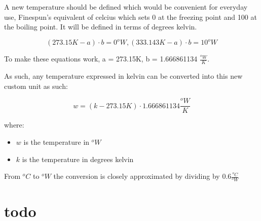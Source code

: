 \documentclass[a4paper]{article}
\begin{document}
	A new temperature should be defined which would be convenient for everyday use, Finespun's equivalent of celcius which sets 0 at the freezing point and 100 at the boiling point.
	It will be defined in terms of degrees kelvin.
	
	$$ (273.15K - a) \cdot b = 0^oW , (333.143K - a) \cdot b = 10^oW $$
	
	To make these equations work, a = 273.15K, b = 1.666861134 $\frac{^oW}{K}$.
	
	As such, any temperature expressed in kelvin can be converted into this new custom unit as such:
	
	$$ w = (k - 273.15K) \cdot 1.666861134 \frac{^oW}{K} $$
	
	where:
	
	\begin{itemize}
		\item $w$ is the temperature in $^oW$
		
		\item $k$ is the temperature in degrees kelvin
	\end{itemize}
	
	\bigskip
    
    From $^oC$ to $^oW$ the conversion is closely approximated by dividing by 0.6$\frac{^oC}{^oW}$
    
	\pagebreak
	
	\section{todo}
	
\end{document}
